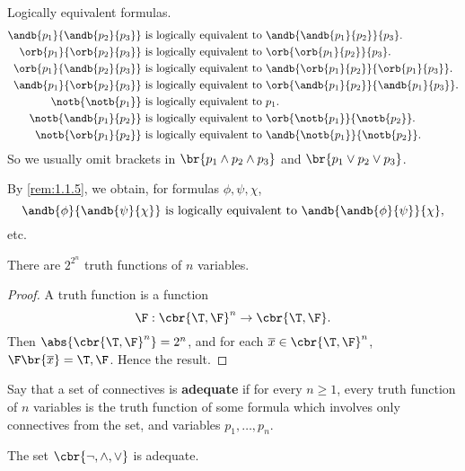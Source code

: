 \begin{example*}
Logically equivalent formulas.
\begin{align*}
\andb{p_1}{\andb{p_2}{p_3}} \ & \text{is logically equivalent to} \ \andb{\andb{p_1}{p_2}}{p_3}. \\
\orb{p_1}{\orb{p_2}{p_3}} \ & \text{is logically equivalent to} \ \orb{\orb{p_1}{p_2}}{p_3}. \\
\orb{p_1}{\andb{p_2}{p_3}} \ & \text{is logically equivalent to} \ \andb{\orb{p_1}{p_2}}{\orb{p_1}{p_3}}. \\
\andb{p_1}{\orb{p_2}{p_3}} \ & \text{is logically equivalent to} \ \orb{\andb{p_1}{p_2}}{\andb{p_1}{p_3}}. \\
\notb{\notb{p_1}} \ & \text{is logically equivalent to} \ p_1. \\
\notb{\andb{p_1}{p_2}} \ & \text{is logically equivalent to} \ \orb{\notb{p_1}}{\notb{p_2}}. \\
\notb{\orb{p_1}{p_2}} \ & \text{is logically equivalent to} \ \andb{\notb{p_1}}{\notb{p_2}}.
\end{align*}
So we usually omit brackets in $ \br{p_1 \land p_2 \land p_3} $ and $ \br{p_1 \lor p_2 \lor p_3} $.
\end{example*}

\begin{note*}
By \ref{rem:1.1.5}, we obtain, for formulas $ \phi, \psi, \chi $,
$$ \andb{\phi}{\andb{\psi}{\chi}} \ \text{is logically equivalent to} \ \andb{\andb{\phi}{\psi}}{\chi}, $$
etc.
\end{note*}

\begin{lemma}
There are $ 2^{2^n} $ truth functions of $ n $ variables.
\end{lemma}

\begin{proof}
A truth function is a function
$$ \F : \cbr{\T, \F}^n \to \cbr{\T, \F}. $$
Then $ \abs{\cbr{\T, \F}^n} = 2^n $, and for each $ \overline{x} \in \cbr{\T, \F}^n $, $ \F\br{\overline{x}} = \T, \F $. Hence the result.
\end{proof}

\begin{definition}
Say that a set of connectives is \textbf{adequate} if for every $ n \ge 1 $, every truth function of $ n $ variables is the truth function of some formula which involves only connectives from the set, and variables $ p_1, \dots, p_n $.
\end{definition}

\begin{theorem}
\label{thm:1.1.9}
The set $ \cbr{\neg, \land, \lor} $ is adequate.
\end{theorem}

